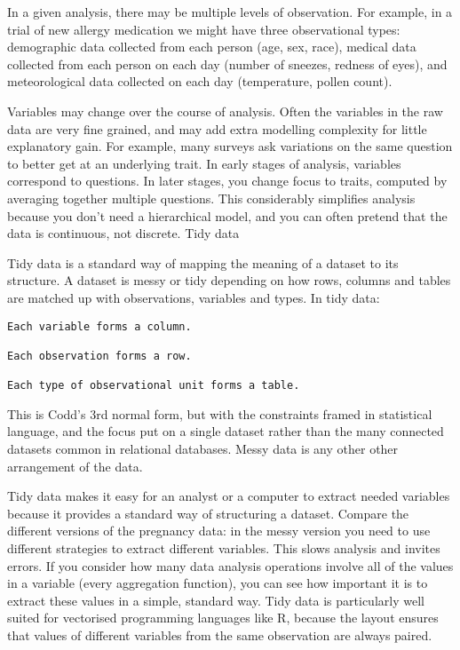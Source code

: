 \documentclass[]{article}
\begin{document}
In a given analysis, there may be multiple levels of observation. For
example, in a trial of new allergy medication we might have three
observational types: demographic data collected from each person (age,
sex, race), medical data collected from each person on each day (number
of sneezes, redness of eyes), and meteorological data collected on each
day (temperature, pollen count).

Variables may change over the course of analysis. Often the variables in
the raw data are very fine grained, and may add extra modelling
complexity for little explanatory gain. For example, many surveys ask
variations on the same question to better get at an underlying trait. In
early stages of analysis, variables correspond to questions. In later
stages, you change focus to traits, computed by averaging together
multiple questions. This considerably simplifies analysis because you
don't need a hierarchical model, and you can often pretend that the data
is continuous, not discrete. Tidy data

Tidy data is a standard way of mapping the meaning of a dataset to its
structure. A dataset is messy or tidy depending on how rows, columns and
tables are matched up with observations, variables and types. In tidy
data:

\begin{verbatim}
Each variable forms a column.

Each observation forms a row.

Each type of observational unit forms a table.
\end{verbatim}

This is Codd's 3rd normal form, but with the constraints framed in
statistical language, and the focus put on a single dataset rather than
the many connected datasets common in relational databases. Messy data
is any other other arrangement of the data.

Tidy data makes it easy for an analyst or a computer to extract needed
variables because it provides a standard way of structuring a dataset.
Compare the different versions of the pregnancy data: in the messy
version you need to use different strategies to extract different
variables. This slows analysis and invites errors. If you consider how
many data analysis operations involve all of the values in a variable
(every aggregation function), you can see how important it is to extract
these values in a simple, standard way. Tidy data is particularly well
suited for vectorised programming languages like R, because the layout
ensures that values of different variables from the same observation are
always paired.
\end{document}
